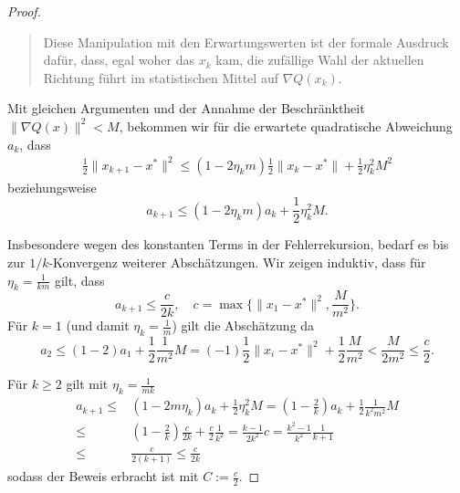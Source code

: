 \documentclass[
]{book}
\newenvironment {JHSAYS} [0] {\begin{quote}\color{jhsc}} {\end{quote}}
\theoremstyle{definition}
\theoremstyle{definition}
\theoremstyle{definition}
\theoremstyle{definition}
\theoremstyle{remark}
\begin{document}
\begin{proof}
\leavevmode{}%
\begin{JHSAYS}
Diese Manipulation mit den Erwartungswerten ist der formale Ausdruck dafür, dass, egal woher das \(x_k\) kam, die zufällige Wahl der aktuellen Richtung führt im statistischen Mittel auf \(\nabla Q(x_k)\).

\end{JHSAYS}

Mit gleichen Argumenten und der Annahme der Beschränktheit \(\|\nabla Q(x)\|^2 < M\), bekommen wir für die erwartete quadratische Abweichung \(a_k\), dass
\begin{equation*}
\begin{split}
\frac 12 \|x_{k+1} - x^* \|^2 \leq (1-2\eta_k m) \frac 12 \|x_{k} - x^*\| + \frac 12 \eta_k^2 M^2
\end{split}
\end{equation*}
beziehungsweise
\begin{equation*}
a_{k+1} \leq (1-2\eta_km)a_k + \frac 12\eta_k^2M.
\end{equation*}

Insbesondere wegen des konstanten Terms in der Fehlerrekursion, bedarf es bis zur \(1/k\)-Konvergenz weiterer Abschätzungen. Wir zeigen induktiv, dass für \(\eta_k=\frac{1}{km}\) gilt, dass
\begin{equation*}
a_{k+1} \leq \frac{c}{2k}, \quad c = \max\{\| x_1 - x^*\|^2, \frac{M}{m^2} \}.
\end{equation*}
Für \(k=1\) (und damit \(\eta_k = \frac 1m\)) gilt die Abschätzung da
\begin{equation*}
a_2 \leq (1-2)a_1 + \frac 12 \frac{1}{m^2}M = (-1)\frac 12 \|x_i-x^*\|^2 + \frac 12 \frac{M}{m^2} < \frac{M}{2 m^2} \leq \frac c2.
\end{equation*}

Für \(k\geq 2\) gilt mit \(\eta_k = \frac{1}{mk}\)
\begin{equation*}
\begin{split}
a_{k+1} \leq & (1-2m \eta_k)a_k + \frac 12 \eta_k^2 M =  (1-\frac 2k)a_k + \frac 12 \frac{1}{k^2m^2}M \\
\leq&  (1-\frac 2k) \frac c{2k} + \frac c2 \frac{1}{k^2}  =  \frac {k-1}{2k^2}c  = \frac{k^2-1}{k^2}\frac{1}{k+1} \\
\leq& \frac {c}{2(k+1)} \leq \frac{c}{2k}
\end{split}
\end{equation*}
sodass der Beweis erbracht ist mit \(C:=\frac c2\).
\end{proof}
\end{document}
